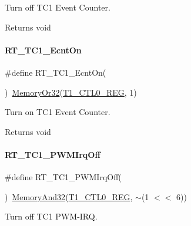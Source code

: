 Turn off T\+C1 Event Counter. 

\begin{DoxyReturn}{Returns}
void 
\end{DoxyReturn}
\mbox{\label{a00044_add9b6f778a744d79226f5165a04a38d9}} 
\paragraph{\texorpdfstring{R\+T\+\_\+\+T\+C1\+\_\+\+Ecnt\+On}{RT\_TC1\_EcntOn}}
{\footnotesize\ttfamily \#define R\+T\+\_\+\+T\+C1\+\_\+\+Ecnt\+On(\begin{DoxyParamCaption}{ }\end{DoxyParamCaption})~\mbox{\hyperlink{a00020_a27874a97deab7cecdde5ddecf466e31e}{Memory\+Or32}}(\mbox{\hyperlink{a00020_adadaa0ab1ebbd7ba9b70dfd24c3ed44da38632250c2e72df96fcaa3f8bd8ecc5e}{T1\+\_\+\+C\+T\+L0\+\_\+\+R\+EG}}, 1)}



Turn on T\+C1 Event Counter. 

\begin{DoxyReturn}{Returns}
void 
\end{DoxyReturn}
\mbox{\label{a00044_a1c33903adfe470964d7eb5126c4ce7d4}} 
\paragraph{\texorpdfstring{R\+T\+\_\+\+T\+C1\+\_\+\+P\+W\+M\+Irq\+Off}{RT\_TC1\_PWMIrqOff}}
{\footnotesize\ttfamily \#define R\+T\+\_\+\+T\+C1\+\_\+\+P\+W\+M\+Irq\+Off(\begin{DoxyParamCaption}{ }\end{DoxyParamCaption})~\mbox{\hyperlink{a00020_ad87cedffcaadc51db22594fce55173d4}{Memory\+And32}}(\mbox{\hyperlink{a00020_adadaa0ab1ebbd7ba9b70dfd24c3ed44da38632250c2e72df96fcaa3f8bd8ecc5e}{T1\+\_\+\+C\+T\+L0\+\_\+\+R\+EG}}, $\sim$(1 $<$$<$ 6))}



Turn off T\+C1 P\+W\+M-\/\+I\+RQ. 

